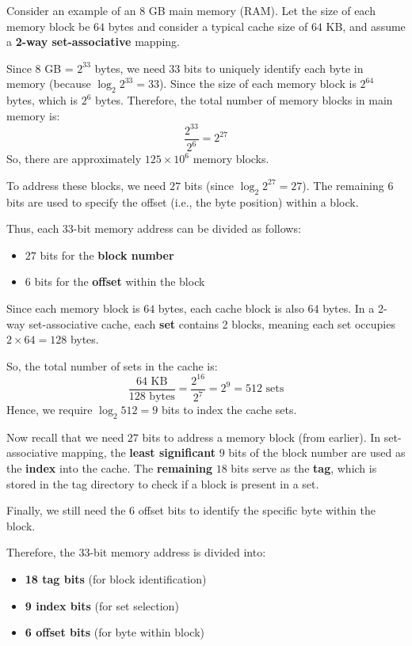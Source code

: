\documentclass[12pt]{book}
\begin{document}
\begin{example}
Consider an example of an $8$ GB main memory (RAM). Let the size of each memory block be $64$ bytes and consider a typical cache size of $64$ KB, and assume a \textbf{2-way set-associative} mapping.

Since $8$ GB = $2^{33}$ bytes, we need $33$ bits to uniquely identify each byte in memory (because $\log_2 2^{33} = 33$). Since the size of each memory block is $2^{64}$ bytes, which is $2^6$ bytes. Therefore, the total number of memory blocks in main memory is:
\[
    \frac{2^{33}}{2^6} = 2^{27}
\]
So, there are approximately $125 \times 10^6$ memory blocks.

To address these blocks, we need $27$ bits (since $\log_2 2^{27} = 27$). The remaining $6$ bits are used to specify the offset (i.e., the byte position) within a block.

Thus, each $33$-bit memory address can be divided as follows:
\begin{itemize}
    \item $27$ bits for the \textbf{block number}
    \item $6$ bits for the \textbf{offset} within the block
\end{itemize}

Since each memory block is $64$ bytes, each cache block is also $64$ bytes. In a 2-way set-associative cache, each \textbf{set} contains 2 blocks, meaning each set occupies $2 \times 64 = 128$ bytes.

So, the total number of sets in the cache is:
\[
    \frac{64 \text{ KB}}{128 \text{ bytes}} = \frac{2^{16}}{2^7} = 2^9 = 512 \text{ sets}
\]
Hence, we require $\log_2 512 = 9$ bits to index the cache sets.

Now recall that we need $27$ bits to address a memory block (from earlier). In set-associative mapping, the \textbf{least significant} $9$ bits of the block number are used as the \textbf{index} into the cache. The \textbf{remaining} $18$ bits serve as the \textbf{tag}, which is stored in the tag directory to check if a block is present in a set.

Finally, we still need the $6$ offset bits to identify the specific byte within the block.

Therefore, the 33-bit memory address is divided into:
\begin{itemize}
    \item \textbf{18 tag bits} (for block identification)
    \item \textbf{9 index bits} (for set selection)
    \item \textbf{6 offset bits} (for byte within block)
\end{itemize}


\end{example}
\end{document}
